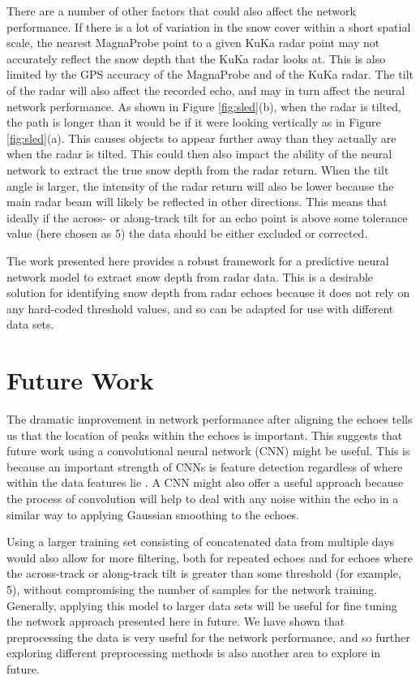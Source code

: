\documentclass[11pt, a4paper]{article}
\begin{document}
There are a number of other factors that could also affect the network performance.  If there is a lot of variation in the snow cover within a short spatial scale, the nearest MagnaProbe point to a given KuKa radar point may not accurately reflect the snow depth that the KuKa radar looks at.  This is also limited by the GPS accuracy of the MagnaProbe and of the KuKa radar. The tilt of the radar will also affect the recorded echo, and may in turn affect the neural network performance. As shown in Figure \ref{fig:sled}(b), when the radar is tilted, the path is longer than it would be if it were looking vertically as in Figure \ref{fig:sled}(a). This causes objects to appear further away than they actually are when the radar is tilted.  This could then also impact the ability of the neural network to extract the true snow depth from the radar return.  When the tilt angle is larger, the intensity of the radar return will also be lower because the main radar beam will likely be reflected in other directions. This means that ideally if the across- or along-track tilt for an echo point is above some tolerance value (here chosen as 5\degree) the data should be either excluded or corrected. 

The work presented here provides a robust framework for a predictive neural network model to extract snow depth from radar data. This is a desirable solution for identifying snow depth from radar echoes because it does not rely on any hard-coded threshold values, and so can be adapted for use with different data sets. 

\section{Future Work}

The dramatic improvement in network performance after aligning the echoes tells us that the location of peaks within the echoes is important. This suggests that future work using a convolutional neural network (CNN) might be useful.  This is because an important strength of CNNs is feature detection regardless of where within the data features lie \cite{cnn}. A CNN might also offer a useful approach because the process of convolution will help to deal with any noise within the echo in a similar way to applying Gaussian smoothing to the echoes.

Using a larger training set consisting of concatenated data from multiple days would also allow for more filtering, both for repeated echoes and for echoes where the across-track or along-track tilt is greater than some threshold (for example, 5\degree), without compromising the number of samples for the network training. Generally, applying this model to larger data sets will be useful for fine tuning the network approach presented here in future. We have shown that preprocessing the data is very useful for the network performance, and so further exploring different preprocessing methods is also another area to explore in future.
\end{document}

